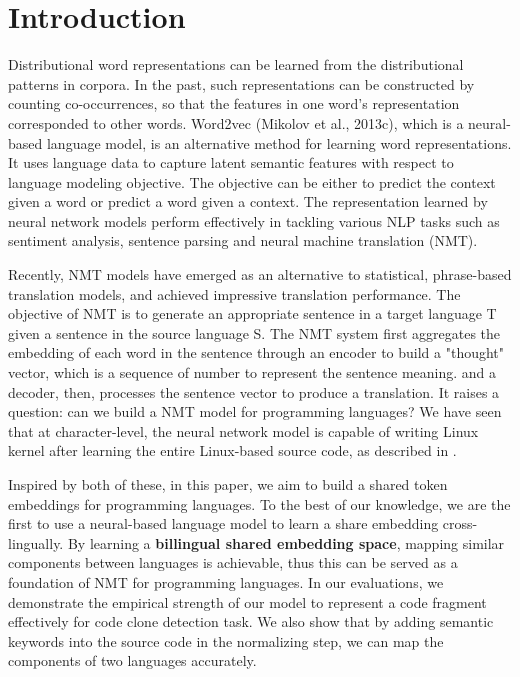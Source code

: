 \section{Introduction}

Distributional word representations can be learned from the distributional patterns in corpora. In the past, such representations can be constructed by counting co-occurrences, so that the features in one word's representation corresponded to other words. Word2vec (Mikolov et al., 2013c), which is a neural-based language model, is an alternative method for learning word representations. It uses language data to capture latent semantic features with respect to language modeling objective. The objective can be either to predict the context given a word or predict a word given a context. The representation learned by neural network models perform effectively in tackling various NLP tasks such as sentiment analysis, sentence parsing and neural machine translation (NMT).

Recently, NMT models have emerged as an alternative to statistical, phrase-based translation models, and achieved impressive translation performance. The objective of NMT is to generate an appropriate sentence in a target language T given a sentence in the source language S. The NMT system first aggregates the embedding of each word in the sentence through an encoder to build a "thought" vector, which is a sequence of number to represent the sentence meaning. and a decoder, then, processes the sentence vector to produce a translation. It raises a question: can we build a NMT model for programming languages? We have seen that at character-level, the neural network model is capable of writing Linux kernel after learning the entire Linux-based source code, as described in \cite{Karpathy}. 

Inspired by both of these, in this paper, we aim to build a shared token embeddings for programming languages. To the best of our knowledge, we are the first to use a neural-based language model to learn a share embedding cross-lingually. By learning a \textbf{billingual shared embedding space}, mapping similar components between languages is achievable, thus this can be served as a foundation of NMT for programming languages. In our evaluations, we demonstrate the empirical strength of our model to represent a code fragment effectively for code clone detection task. We also show that by adding semantic keywords into the source code in the normalizing step, we can map the components of two languages accurately. 




